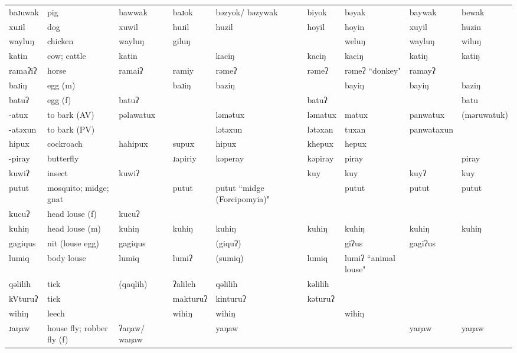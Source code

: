 \begin{landscape}
\begin{longtable}{*{9}{>{\raggedright\arraybackslash}p{}}}
\text{*}baɹuwak & pig & bawwak & baɹok & bəzyok/ \newline bəzywak & biyok & bəyak & baywak & bewak\\
\text{*}xuɹil & dog & xuwil & huɹil & huzil & hoyil & hoyin & xuyil & huzin\\
\text{*}wayluŋ & chicken & wayluŋ & giluŋ &  &  & weluŋ & wayluŋ & wiluŋ\\
\text{*}katin & cow; cattle & katin &  & kaciŋ & kaciŋ & kaciŋ & katiŋ & katiŋ\\
\text{*}ramaʔiʔ & horse & ramaiʔ & ramiy & rəmeʔ & rəmeʔ & rəmeʔ \newline ``donkey" & ramayʔ & \\
\text{*}baɹiŋ & egg (m) &  & baɹiŋ & baziŋ &  & bayiŋ & bayiŋ & baziŋ\\
\text{*}batuʔ & egg (f) & batuʔ &  &  & batuʔ &  &  & batu\\
\text{*}-atux & to bark (AV) & pəlawatux &  & ləmətux & ləmatux & matux & panwatux & (məruwatuk)\\
\text{*}-atəxun & to bark (PV) &  &  & lətəxun & lətəxan & tuxan & panwataxun & \\
\text{*}hipux & cockroach & hahipux & supux & hipux & khepux & hepux &  & \\
\text{*}-piray & butterfly &  & ɹapiriy & kəperay & kəpiray & piray &  & piray\\
\text{*}kuwiʔ & insect & kuwiʔ &  &  & kuy & kuy & kuyʔ & kuy\\
\text{*}putut & mosquito; midge; gnat &  & putut & putut ``midge (Forcipomyia)" &  & putut & putut & putut\\
\text{*}kucuʔ & head louse (f) & kucuʔ &  &  &  &  &  & \\
\text{*}kuhiŋ & head louse (m) & kuhiŋ & kuhiŋ & kuhiŋ & kuhiŋ & kuhiŋ & kuhiŋ & kuhiŋ\\
\text{*}gagiqus & nit (louse egg) & gagiqus &  & (giquʔ) &  & giʔus & gagiʔus & \\
\text{*}lumiq & body louse & lumiq & lumiʔ & (sumiq) & lumiq & lumiʔ \newline ``animal louse" &  & \\
\text{*}qəlilih & tick & (qaqlih) & ʔalileh & qəlilih & kəlilih &  &  & \\
\text{*}kVturuʔ & tick &  & makturuʔ & kinturuʔ & kəturuʔ &  &  & \\
\text{*}wihiŋ & leech &  & wihiŋ & wihiŋ &  & wihiŋ &  & \\
\text{*}ɹaŋaw & house fly; robber fly (f) & ʔaŋaw/ \newline waŋaw &  & yaŋaw &  &  & yaŋaw & yaŋaw\\

\end{longtable}
\end{landscape}
